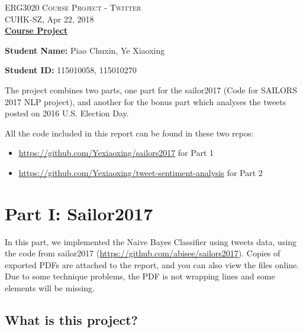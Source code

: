 \documentclass[12pt,a4paper]{report}
\begin{document}
\begin{center}
  \textsc{ERG3020 Course Project - Twitter} \\
  CUHK-SZ, Apr 22, 2018
  \\[\baselineskip]

  \textbf{\underline{Course Project}}
\end{center}

\noindent\textbf{Student Name:}  Piao Chuxin, Ye Xiaoxing

\noindent\textbf{Student ID:}  115010058, 115010270

\noindent\hrulefill

The project combines two parts, one part for the sailor2017 (Code for SAILORS 2017 NLP project), and another for the bonus part which analyses the tweets posted on 2016 U.S. Election Day.

All the code included in this report can be found in these two repos:

\begin{itemize}
  \item \url{https://github.com/Yexiaoxing/sailors2017} for Part 1
  \item \url{https://github.com/Yexiaoxing/tweet-sentiment-analysis} for Part 2
\end{itemize}

\tableofcontents

\newpage

\chapter{Part I: Sailor2017}\label{header-n0}

In this part, we implemented the Naive Bayes Classifier using tweets
data, using the code from sailor2017
(\url{https://github.com/abisee/sailors2017}). Copies of exported PDFs
are attached to the report, and you can also view the files online. Due
to some technique problems, the PDF is not wrapping lines and some
elements will be missing.

\section{What is this project?}\label{header-n10}
\end{document}
